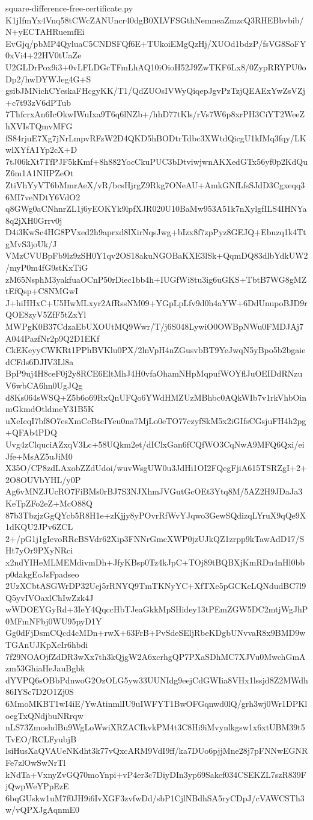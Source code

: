 \documentclass[11pt]{article}
\theoremstyle{definition}
\theoremstyle{remark}
\begin{document}
\begin{filecontents*}[overwrite]{square-difference-free-certificate.py}
K1jIfmYx4Vnq58tCWcZANUncr40dgB0XLVFSGthNemneaZmzcQ3RHEBbvbib/N+yECTAHRuemfEi
EvGjq/pbMP4QyluaC5CNDSFQf6E+TUkoiEMgQzHj/XUOd1bdzP/fsVG8SoFY0xVi4+22HV0tUaZe
U2GLDrPox9i3+0vLFLDGcTFmLhAQ10iOioH52J9ZwTKF6Lx8/0ZypRRYPU0oDp2/hwDYWJeg4G+S
gsibJMNichCYeskaFHcgyKK/T1/QdZUOsIVWyQiqepJgvPzTzjQEAExYwZsVZj+c7t93zV6dPTub
7ThfcrxAn6IcOkwIWuIxa9T6q6lNZb+/hhD77tKls/rVs7W6p8xrPH3CiYT2WeeZhXVIsTQmvMFG
fS84rjuE7Xg7jNrLmpvRFzW2D4QKD5hBODtrTdbc3XWtdQicgU1kIMq3fqy/LKwlXYfA1Yp2cX+D
7tJ06kXt7TfPJF5kKmf+8h882YocCkuPUC3bDtviwjwnAKXedGTx56yf0p2KdQuZ6m1A1NHPZeOt
ZtiVhYyVT6bMmrAeX/vR/bcsHjrgZ9Rkg7ONeAU+AmkGNfLfsSJdD3Cgxeqq36MI7veNDtY6VdO2
q8GWg0aCNhnrZL1j6yEOKYk9lpfXJR020U10BaMw953A51k7nXylgfILS4IHNYa8q2jXH0Grrv0j
D4i3KwSc4HG8PVxed2h9aprxd8lXirNqsJwg+bIzx8f7zpPyz8GEJQ+Ebuzq1k4TtgMvS3joUk/J
VMzCVUBpFb9lz9zSH0Y1qv2OS18akuNGOBaKXE3lSk+QqmDQ83dlbYdkUW2/myP0m4fG9stKxTiG
zM65NsphM3yakfuaOCnP50rDiec1bb4h+IUGfWi8tu3ig6uGKS+TbtB7WG8gMZtEfQsp+C8NMGwI
J+hiHHxC+U5HwMLxyr2AfRssNM09+YGpLpLfv9d0h4aYW+6DdUnupoBJD9rQOE8zyV5ZfF5tZxYl
MWPgK0B37CdzaEbUXOUtMQ9Wwr/T/j6S048LywiO0OWBpNWu0FMDJAj7A044PazfNr2p9Q2D1EKf
CkEKeyyCWKRt1PPhBVKlu0PX/2lnVpH4nZGusvbBT9YeJwqN5yBpo5b2bgaiedCFds6DJIV3Ll8a
BpP9uj4H8ceF0j2y8RCE6EltMhJ4H0vfaOhamNHpMqpufWOYflJuOEIDdRNzuV6wbCA6hn0UgJQg
d8Ks064sWSQ+Z5b6o69RxQnUFQo6YWdHMZUzMBhbc0AQkWIb7v1rkVhbOinmGkmdOtldmeY31B5K
uXeIcqI7bf8O7esXmCeBtcIYeu0na7MjLo0eTO77czyfSkM5x2iGIfsCGsjuFH4h2pg+QFAb4PDQ
Uvg4zClquciAZxqV3Lc+58UQkm2et/dIClxGan6fCQfWO3CqNwA9MFQ6Qxi/eiJfe+MsAZ5uJiM0
X35O/CP8zdLAxobZZdUdoi/wuvWsgUW0u3JdHi1OI2FQegFjiA615TSRZgI+2+2O8OUVbYHL/y0P
Ag6vMNZJUcRO7FiBMs0rBJ7S3NJXhmJVGutGcOEt3Ytq8M/5AZ2H9JDaJa3KeTpZFo2eZ+McO88Q
87b3TbzjzGgQYcb5R8H1e+zKjjy8yPOvrRfWvYJqwo3GewSQdizqLYruX9qQe9X1dKQU2JPv6ZCL
2+/pG1j1gIevoRRcBSVdr62Xip3FNNrGmcXWP0jzUJkQZ1zrpp9kTawAdD17/SHt7yOr9PXyNRci
x2ndYIHeMLMEMdivmDh+JfyKBsp0Tz4kJpC+TOj89tBQBXjKmRDn4nHl0bbp0dakgEoJsFpadseo
2UzXCbtASGWrDP32Uej5rRNYQ9TmTKNyYC+XfTXe5pGCKcLQNdudBC7l9Q5yvIVOaxlChIwZzk4J
wWDOEYGyRd+3IeY4QqccHbTJeaGkkMpSHidey13tPEmZGW5DC2mtjWgJhP0MFmNFbj0WU95pyD1Y
Gg0dFjDsmCQcd4cMDn+rwX+63FrB+PvSdeSEljRbeKDgbUNvvaR8x9BMD9wTGAnUJKpXcIr6hbdi
7f29NOAOjfZdDR3wXx7th3kQjgW2A6xcrhgQP7PXaSDhMC7XJVu0MwchGmAzm53GhiaHeJauBgbk
dYVPQ6sOBbPdnwoG2OzOLG5yw33UUNIdg9eejCdGWIia8VHx1lssjd8Z2MWdh86IYSc7D2O1Zj0S
6MmoMKBT1wI4iE/YwAtinmlIU9uIWFYT1BwOFGqnwd0lQ/grh3wj0Wr1DPKloegTxQNdjbuNRrqw
nLS73ZmoshdBu9WgLoWwiXRZACIkvkPM4t3C8Hi9iMvynlkgsw1x6xtUBM39t5TvEO/RCLFyubjB
lsiHusXaQVAUeNKdht3k77vQxcARM9VdI9ff/ka7DUo6pjjMne28j7pFNNwEGNRFe7zlOwSwNrTl
kNdTa+VxnyZvGQ70moYnpi+vP4er3c7DiyDIn3yp69Sakcf034CSEKZL7szR839FjQwpWeYPpEzE
6bqGUskw1uM7f0JH9i6IvXGF3zvfwDd/sbP1CjlNBdhSA5ryCDpJ/cVAWCSTh3w/vQPXJgAqnmE0

\end{filecontents*}
\end{document}
